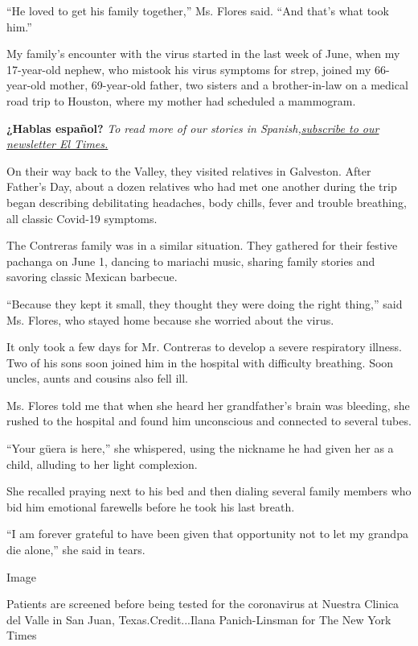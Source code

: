 ``He loved to get his family together,'' Ms. Flores said. ``And that's
what took him.''

My family's encounter with the virus started in the last week of June,
when my 17-year-old nephew, who mistook his virus symptoms for strep,
joined my 66-year-old mother, 69-year-old father, two sisters and a
brother-in-law on a medical road trip to Houston, where my mother had
scheduled a mammogram.

\textbf{¿Hablas español?} \emph{To read more of our stories in
Spanish,}\href{https://www.nytimes3xbfgragh.onion/newsletters/el-times}{\emph{subscribe
to our newsletter El Times.}}

On their way back to the Valley, they visited relatives in Galveston.
After Father's Day, about a dozen relatives who had met one another
during the trip began describing debilitating headaches, body chills,
fever and trouble breathing, all classic Covid-19 symptoms.

The Contreras family was in a similar situation. They gathered for their
festive pachanga on June 1, dancing to mariachi music, sharing family
stories and savoring classic Mexican barbecue.

``Because they kept it small, they thought they were doing the right
thing,'' said Ms. Flores, who stayed home because she worried about the
virus.

It only took a few days for Mr. Contreras to develop a severe
respiratory illness. Two of his sons soon joined him in the hospital
with difficulty breathing. Soon uncles, aunts and cousins also fell ill.

Ms. Flores told me that when she heard her grandfather's brain was
bleeding, she rushed to the hospital and found him unconscious and
connected to several tubes.

``Your güera is here,'' she whispered, using the nickname he had given
her as a child, alluding to her light complexion.

She recalled praying next to his bed and then dialing several family
members who bid him emotional farewells before he took his last breath.

``I am forever grateful to have been given that opportunity not to let
my grandpa die alone,'' she said in tears.

Image

Patients are screened before being tested for the coronavirus at Nuestra
Clinica del Valle in San Juan, Texas.Credit...Ilana Panich-Linsman for
The New York Times

